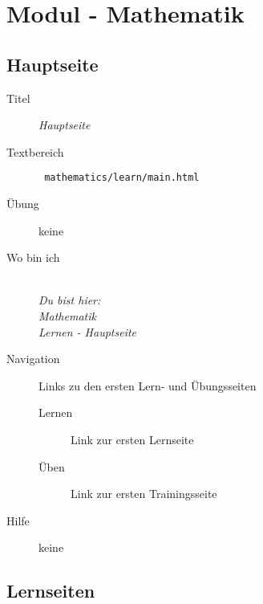 \chapter{ Modul - Mathematik }
\label{cha:math-module}

\section{ Hauptseite }
\label{cha:math-module-mainpage}
\begin{description}
  \item[Titel] \emph{ Hauptseite }
  \item[Textbereich] \texttt{ mathematics/learn/main.html }
  \item[Übung] keine
  \item[Wo bin ich] \emph{\\Du bist hier:\\Mathematik\\Lernen - Hauptseite}
  \item[Navigation] Links zu den ersten Lern- und Übungsseiten
  \begin{description}
    \item[Lernen] Link zur ersten Lernseite 
    \item[Üben] Link zur ersten Trainingsseite 
  \end{description}
  \item[Hilfe] keine
\end{description}



\section{ Lernseiten }

